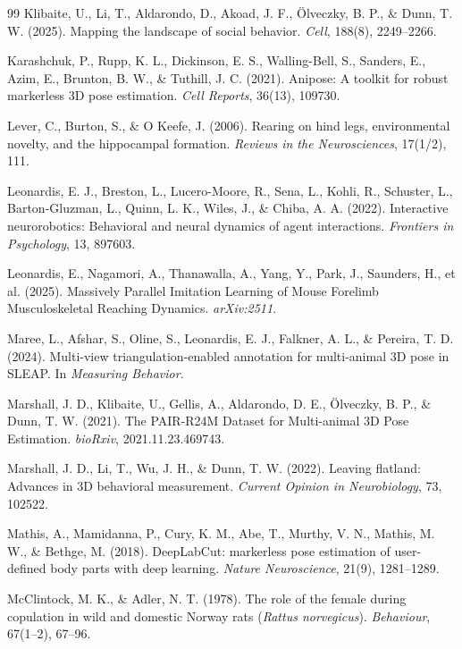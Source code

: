 \documentclass[pdflatex, sn-nature]{sn-jnl}
\theoremstyle{thmstyleone}%
\theoremstyle{thmstyletwo}%
\theoremstyle{thmstylethree}%
\begin{document}
\begin{thebibliography}{99}
 Klibaite, U., Li, T., Aldarondo, D., Akoad, J. F., Ölveczky, B. P., \& Dunn, T. W. (2025). Mapping the landscape of social behavior. \textit{Cell}, 188(8), 2249--2266.

 Karashchuk, P., Rupp, K. L., Dickinson, E. S., Walling-Bell, S., Sanders, E., Azim, E., Brunton, B. W., \& Tuthill, J. C. (2021). Anipose: A toolkit for robust markerless 3D pose estimation. \textit{Cell Reports}, 36(13), 109730.

 Lever, C., Burton, S., \& O Keefe, J. (2006).  Rearing on hind legs, environmental novelty, and the hippocampal formation. \textit{Reviews in the Neurosciences}, 17(1/2), 111.

 Leonardis, E. J., Breston, L., Lucero-Moore, R., Sena, L., Kohli, R., Schuster, L., Barton-Gluzman, L., Quinn,  L. K., Wiles, J., \& Chiba, A. A. (2022). Interactive neurorobotics: Behavioral and neural dynamics of agent interactions. \textit{Frontiers in Psychology}, 13, 897603.

 Leonardis, E., Nagamori, A., Thanawalla, A., Yang, Y., Park, J., Saunders, H., et al. (2025). Massively Parallel Imitation Learning of Mouse Forelimb Musculoskeletal Reaching Dynamics. \textit{arXiv:2511}.

 Maree, L., Afshar, S., Oline, S., Leonardis, E. J., Falkner, A. L., \& Pereira, T. D. (2024). Multi-view triangulation-enabled annotation for multi-animal 3D pose in SLEAP. In \textit{Measuring Behavior}.

 Marshall, J. D., Klibaite, U., Gellis, A., Aldarondo, D. E., Ölveczky, B. P., \& Dunn, T. W. (2021). The PAIR-R24M Dataset for Multi-animal 3D Pose Estimation. \textit{bioRxiv}, 2021.11.23.469743.

 Marshall, J. D., Li, T., Wu, J. H., \& Dunn, T. W. (2022). Leaving flatland: Advances in 3D behavioral measurement. \textit{Current Opinion in Neurobiology}, 73, 102522.

 Mathis, A., Mamidanna, P., Cury, K. M., Abe, T., Murthy, V. N., Mathis, M. W., \& Bethge, M. (2018). DeepLabCut: markerless pose estimation of user-defined body parts with deep learning. \textit{Nature Neuroscience}, 21(9), 1281--1289.

 McClintock, M. K., \& Adler, N. T. (1978). The role of the female during copulation in wild and domestic Norway rats (\textit{Rattus norvegicus}). \textit{Behaviour}, 67(1--2), 67--96.


\end{thebibliography}
\end{document}
